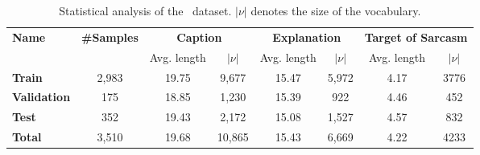 \begin{table*}[t!]
  \setlength{\tabcolsep}{1mm}
    \small
  \centering
      \begin{tabular}{lccccccc}
    \toprule
    \multirow{2}{*}{\bf Name} & \multirow{2}{*}{\bf \#Samples} & \multicolumn{2}{c}{\bf Caption}             & \multicolumn{2}{c}{\bf Explanation}        & \multicolumn{2}{c}{\bf Target of Sarcasm}  \\ \cmidrule{3-8} 
                          &                           & {Avg. length} & $|\nu|$    & {Avg. length} & $|\nu|$   & {Avg. length} & $|\nu|$  \\ \midrule
    \bf Train                 & 2,983                     & {19.75}      & 9,677  & {15.47}      & 5,972 & {4.17}       & 3776 \\ 
    \bf Validation                   & 175                       & {18.85}      & 1,230  & {15.39}      & 922   & {4.46}       & 452  \\ 
    \bf Test                  & 352                       & {19.43}      & 2,172  & {15.08}      & 1,527 & {4.57}       & 832  \\ 
    \bf Total                 & 3,510                     & {19.68}      & 10,865 & {15.43}      & 6,669 & {4.22}       & 4233 \\ \bottomrule
    \end{tabular}
  \caption{Statistical analysis of the \dataset\ dataset. $|\nu|$ denotes the size of the vocabulary.}
  \label{table:datset-stats}
\end{table*}